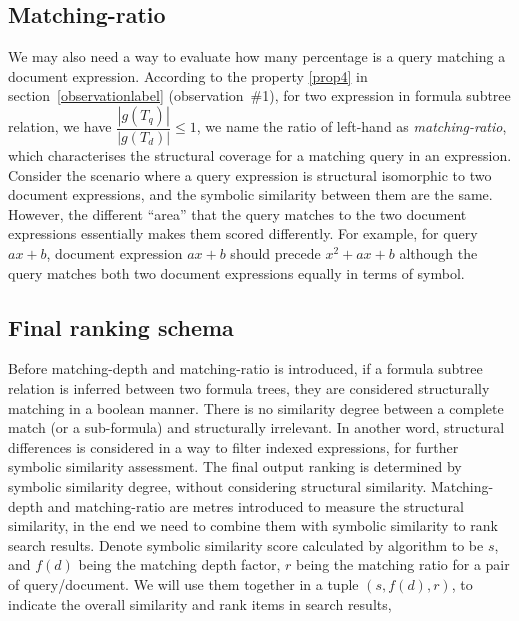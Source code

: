\subsection{Matching-ratio}
We may also need a way to evaluate how many percentage is a query matching a document expression.
According to the property \ref{prop4} in section~\ref{observationlabel} (observation~\#1), for two expression in formula subtree relation, we have $\dfrac{|g(T_q)|}{|g(T_d)|} \le 1$, 
we name the ratio of left-hand as \textit{matching-ratio}, which characterises the structural coverage for a matching query in an expression.
Consider the scenario where a query expression is structural isomorphic to two document expressions, and the symbolic similarity between them are the same.
However, the different ``area'' that the query matches to the two document expressions essentially makes them scored differently.
For example, for query $ax + b$, document expression $ax + b$ should precede $x^2 + ax + b$ although the query matches both two document expressions equally in terms of symbol.

\subsection{Final ranking schema}
Before matching-depth and matching-ratio is introduced, if a formula subtree relation is inferred between two formula trees, they are considered structurally matching in a boolean manner. 
There is no similarity degree between a complete match (or a sub-formula) and structurally irrelevant. 
In another word, structural differences is considered in a way to filter indexed expressions, for further symbolic similarity assessment. 
The final output ranking is determined by symbolic similarity degree, without considering structural similarity. 
Matching-depth and matching-ratio are metres introduced to measure the structural similarity, in the end we need to combine them with symbolic similarity to rank search results.
Denote symbolic similarity score calculated by  algorithm to be $s$, and $f(d)$ being the matching depth factor, $r$ being the matching ratio for a pair of query/document. 
We will use them together in a tuple $(s, f(d), r)$, to indicate the overall similarity and rank items in search results,


